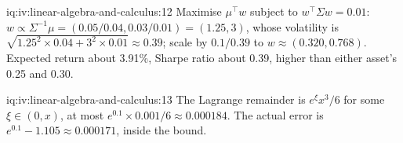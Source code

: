 \begin{solution}{iq:iv:linear-algebra-and-calculus:12}
Maximise $\mu^\top w$ subject to $w^\top\Sigma w = 0.01$: $w \propto \Sigma^{-1}\mu = (0.05/0.04, 0.03/0.01) = (1.25,
3)$, whose volatility is $\sqrt{1.25^2 \times 0.04 + 3^2 \times 0.01} \approx 0.39$; scale by $0.1/0.39$ to $w \approx
(0.320, 0.768)$. Expected return about 3.91\%, Sharpe ratio about 0.39, higher than either asset's 0.25 and 0.30.
\end{solution}

\begin{solution}{iq:iv:linear-algebra-and-calculus:13}
The Lagrange remainder is $e^\xi x^3/6$ for some $\xi \in (0, x)$, at most $e^{0.1} \times 0.001/6 \approx 0.000184$. The
actual error is $e^{0.1} - 1.105 \approx 0.000171$, inside the bound.
\end{solution}
